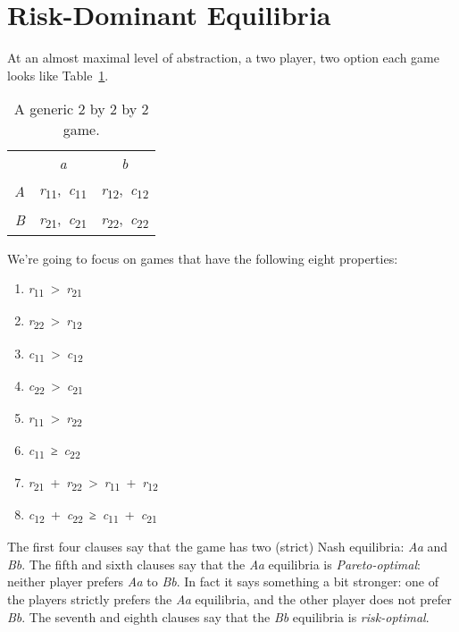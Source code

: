 \documentclass[
  12pt,
  letterpaper,
]{scrbook}
\providecommand{\tightlist}{%
  \setlength{\itemsep}{0pt}\setlength{\parskip}{0pt}}\usepackage{longtable,booktabs,array}
\begin{document}
\section{Risk-Dominant Equilibria}\label{sec-globalgame}

At an almost maximal level of abstraction, a two player, two option each
game looks like Table~\ref{tbl-generic-game}.

\begin{longtable}[]{@{}rcc@{}}
\caption{A generic 2 by 2 by 2
game.}\label{tbl-generic-game}\tabularnewline
\toprule\noalign{}
\endfirsthead
\endhead
\bottomrule\noalign{}
\endlastfoot
& \emph{a} & \emph{b} \\
\emph{A} & \emph{r}\textsubscript{11},~\emph{c}\textsubscript{11} &
\emph{r}\textsubscript{12},~\emph{c}\textsubscript{12} \\
\emph{B} & \emph{r}\textsubscript{21},~\emph{c}\textsubscript{21} &
\emph{r}\textsubscript{22},~\emph{c}\textsubscript{22} \\
\end{longtable}

We're going to focus on games that have the following eight properties:

\begin{enumerate}
\def\labelenumi{\arabic{enumi}.}
\tightlist
\item
  \emph{r}\textsubscript{11}~\textgreater~\emph{r}\textsubscript{21}
\item
  \emph{r}\textsubscript{22}~\textgreater~\emph{r}\textsubscript{12}
\item
  \emph{c}\textsubscript{11}~\textgreater~\emph{c}\textsubscript{12}
\item
  \emph{c}\textsubscript{22}~\textgreater~\emph{c}\textsubscript{21}
\item
  \emph{r}\textsubscript{11}~\textgreater~\emph{r}\textsubscript{22}
\item
  \emph{c}\textsubscript{11}~≥~\emph{c}\textsubscript{22}
\item
  \emph{r}\textsubscript{21}~+~\emph{r}\textsubscript{22}~\textgreater~\emph{r}\textsubscript{11}~+~\emph{r}\textsubscript{12}
\item
  \emph{c}\textsubscript{12}~+~\emph{c}\textsubscript{22}~≥~\emph{c}\textsubscript{11}~+~\emph{c}\textsubscript{21}
\end{enumerate}

The first four clauses say that the game has two (strict) Nash
equilibria: \emph{Aa} and \emph{Bb}. The fifth and sixth clauses say
that the \emph{Aa} equilibria is \emph{Pareto-optimal}: neither player
prefers \emph{Aa} to \emph{Bb}. In fact it says something a bit
stronger: one of the players strictly prefers the \emph{Aa} equilibria,
and the other player does not prefer \emph{Bb}. The seventh and eighth
clauses say that the \emph{Bb} equilibria is \emph{risk-optimal}.
\end{document}
